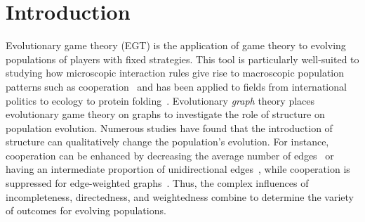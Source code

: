 \documentclass[pdflatex,twocolumn,sn-nature,super]{sn-jnl}
\begin{document}
\section{Introduction}
Evolutionary game theory (EGT) is the application
of game theory to evolving populations
of players with fixed strategies.
This tool is particularly well-suited to studying how microscopic interaction rules
give rise to macroscopic population patterns
such as cooperation~\citep{sigmund1999evolutionary}
and has been applied to fields from international politics to ecology
to protein folding~\citep{traulsen2023future}.
Evolutionary \emph{graph} theory places evolutionary game theory
on graphs to investigate the role of structure on population evolution.
Numerous studies have found that the introduction of structure
can qualitatively change the population's evolution.
For instance, cooperation can be enhanced by
decreasing the average number of edges~\citep{ohtsuki2006simple}
or having an intermediate proportion
of unidirectional edges~\citep{su2022evolution},
while cooperation is suppressed
for edge-weighted graphs~\citep{bhaumik2024constant}.
Thus, the complex influences of
incompleteness, directedness, and weightedness combine
to determine the variety of outcomes for evolving populations.
\end{document}
